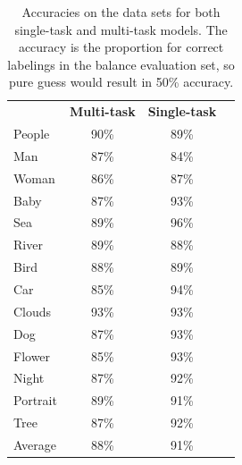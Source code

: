 \begin{table}[]
    \centering
    \begin{tabular}{lccl}
        \multicolumn{1}{l}{\textbf{}}    & \multicolumn{1}{l}{\textbf{Multi-task}} & \multicolumn{1}{l}{\textbf{Single-task}} \\ \cline{2-3}
        \multicolumn{1}{l}{People} & \multicolumn{1}{c}{90\%}            & \multicolumn{1}{c}{89\%}                           \\ \hline
        \multicolumn{1}{l}{Man} & \multicolumn{1}{c}{87\%}               & \multicolumn{1}{c}{84\%}                        \\ \hline
        \multicolumn{1}{l}{Woman} & \multicolumn{1}{c}{86\%}               & \multicolumn{1}{c}{87\%}                           \\ \hline
        \multicolumn{1}{l}{Baby}       & \multicolumn{1}{c}{87\%}            & \multicolumn{1}{c}{93\%}                           \\ \hline
        \multicolumn{1}{l}{Sea}       & \multicolumn{1}{c}{89\%}               & \multicolumn{1}{c}{96\%}                        \\ \hline
        \multicolumn{1}{l}{River}       & \multicolumn{1}{c}{89\%}               & \multicolumn{1}{c}{88\%}                           \\ \hline
        \multicolumn{1}{l}{Bird} & \multicolumn{1}{c}{88\%}            & \multicolumn{1}{c}{89\%}                        \\ \hline
        \multicolumn{1}{l}{Car}       & \multicolumn{1}{c}{85\%}            & \multicolumn{1}{c}{94\%}                        \\ \hline
        \multicolumn{1}{l}{Clouds}       & \multicolumn{1}{c}{93\%}            & \multicolumn{1}{c}{93\%}                        \\ \hline
        \multicolumn{1}{l}{Dog}       & \multicolumn{1}{c}{87\%}            & \multicolumn{1}{c}{93\%}                           \\ \hline
        \multicolumn{1}{l}{Flower} & \multicolumn{1}{c}{85\%}            & \multicolumn{1}{c}{93\%}                        \\ \hline
        \multicolumn{1}{l}{Night}       & \multicolumn{1}{c}{87\%}            & \multicolumn{1}{c}{92\%}                        \\ \hline
        \multicolumn{1}{l}{Portrait}       & \multicolumn{1}{c}{89\%}            & \multicolumn{1}{c}{91\%}                        \\ \hline
        \multicolumn{1}{l}{Tree}       & \multicolumn{1}{c}{87\%}            & \multicolumn{1}{c}{92\%}                           \\ \hline
        \multicolumn{1}{l}{Average}       & \multicolumn{1}{c}{88\%}               & \multicolumn{1}{c}{91\%}                        \\ \hline
    \end{tabular}
    \caption{Accuracies on the data sets for both single-task and multi-task models. 
    The accuracy is the proportion for correct labelings in the balance evaluation set, so pure guess would result in 50\% accuracy.}
\end{table}

